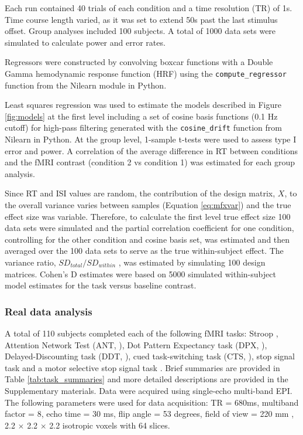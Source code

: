 \documentclass[titlepage,12pt] {article}
\begin{document}
Each run contained 40 trials of each condition and a time resolution (TR) of 1s.  Time course length varied, as it was set to extend 50s past the last stimulus offset.  Group analyses included 100 subjects.  A total of 1000 data sets were simulated to calculate power and error rates. 


Regressors were constructed by convolving boxcar functions with a Double Gamma hemodynamic response function (HRF) using the \verb+compute_regressor+ function from the Nilearn module in Python.  

Least squares regression was used to estimate the models described in Figure \ref{fig:models} at the first level including a set of cosine basis functions (0.1 Hz cutoff) for high-pass filtering generated with the \verb+cosine_drift+ function from Nilearn in Python.  At the group level, 1-sample t-tests were used to assess type I error and power.  A correlation of the average difference in RT between conditions and the fMRI contrast (condition 2 vs condition 1) was estimated for each group analysis.  

Since RT and ISI values are random, the contribution of the design matrix, $X$, to the overall variance varies between samples (Equation \ref{eq:mfxvar}) and the true effect size was variable.  Therefore, to calculate the first level true effect size 100 data sets were simulated and the partial correlation coefficient for one condition, controlling for the other condition and cosine basis set, was estimated and then averaged over the 100 data sets to serve as the true within-subject effect. The variance ratio, $SD_{total}/SD_{within}$ , was estimated by simulating 100 design matrices.  Cohen's D estimates were based on 5000 simulated within-subject model estimates for the task versus baseline contrast.

\subsubsection*{Real data analysis}

A total of 110 subjects completed each of the following fMRI tasks: Stroop \citep{stroop_1935}, Attention Network Test (ANT, \citet{fanTestingEfficiencyIndependence2002}), Dot Pattern Expectancy task (DPX, \citet{macdonald2005}), Delayed-Discounting task (DDT, \citet{kirby2009}), cued task-switching task (CTS, \citet{logan2003}), stop signal task \citep{logan1984} and a motor selective stop signal task \citep{dejong1995}.  Brief summaries are provided in Table \ref{tab:task_summaries} and more detailed descriptions are provided in the Supplementary materials.  Data were acquired using single-echo multi-band EPI. The following parameters were used for data acquisition: TR = 680ms, multiband factor = 8, echo time = 30 ms, flip angle = 53 degrees, field of view = 220 mm , 2.2 $\times$ 2.2 $\times$ 2.2 isotropic voxels with 64 slices.
\end{document}
